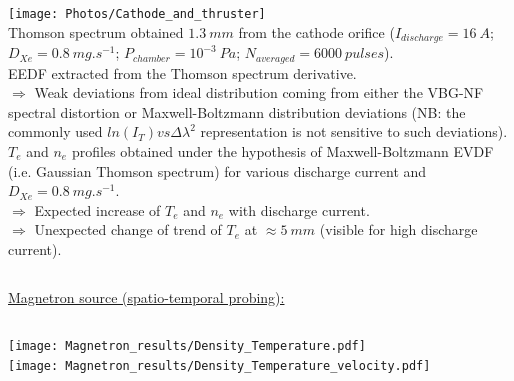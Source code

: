 \documentclass{beamer}
\begin{document}
\begin{frame}[t]
\begin{tcbposter}
{\begin{columns}
   		\begin{column}[T]{0.22\paperwidth}
   		\vspace{-0.034\paperwidth}%
   		\texttt{[image: Photos/Cathode\_and\_thruster]} \\
		\vspace{0.02\paperwidth}%
   		Thomson spectrum obtained $1.3 \ mm$ from the cathode orifice ($I_{discharge}=16 \ A $; $D_{Xe}=0.8 \ mg.s^{-1}$; $P_{chamber}=10^{-3} \ Pa$; $N_{averaged} = 6000 \ pulses $). \\
   		\vspace{0.04\paperwidth}%
        EEDF extracted from the Thomson spectrum derivative.\\
        $\Rightarrow$ Weak deviations from ideal distribution coming from either the VBG-NF spectral distortion or Maxwell-Boltzmann distribution deviations (NB: the commonly used $ln(I_{T}) vs \Delta \lambda^{2}$ representation is not sensitive to such deviations).\\ 
		\vspace{0.05\paperwidth}%
		$T_{e}$ and $n_{e}$ profiles obtained under the hypothesis of Maxwell-Boltzmann EVDF (i.e. Gaussian Thomson spectrum) for various discharge current and $D_{Xe} = 0.8 \ mg.s^{-1}$.\\ 
        $\Rightarrow$ Expected increase of $T_{e}$ and $n_{e}$ with  discharge current. \\
        $\Rightarrow$ Unexpected change of trend of $T_{e}$ at $ \approx 5 \ mm$ (visible for high discharge current).\\
        \end{column}
   
	\end{columns}

    \tcblower
   
    \color{beige} 
    \small
    \underline{Magnetron source (spatio-temporal probing):}
	\begin{columns}
	
    	\begin{column}[T]{0.25\paperwidth}   
   		\vspace{0.01\paperwidth}     
		\texttt{[image: Magnetron\_results/Density\_Temperature.pdf]}\\
		\vspace{0.045\paperwidth}%
		\texttt{[image: Magnetron\_results/Density\_Temperature\_velocity.pdf]}     
        \end{column}
    

\end{columns}}
\end{tcbposter}
\end{frame}
\end{document}
